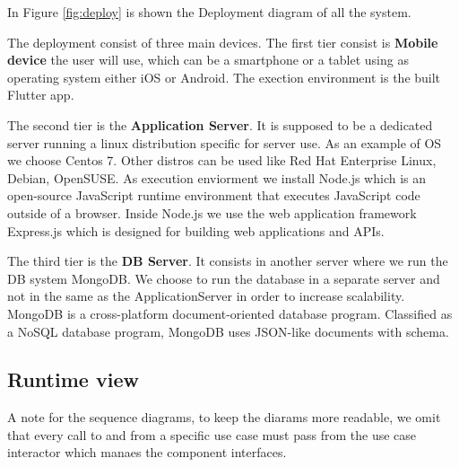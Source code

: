 In Figure \ref{fig:deploy} is shown the Deployment diagram of all the system.

The deployment consist of three main devices. The first tier consist is \textbf{Mobile device} the user will use, which can be a smartphone or a tablet using as operating system either iOS or Android.
The exection environment is the built Flutter app.


The second tier is the \textbf{Application Server}. It is supposed to be a dedicated server running a linux distribution specific for server use. As an example of OS we choose Centos 7. Other distros can be used like Red Hat Enterprise Linux, Debian, OpenSUSE.
As execution enviorment we install Node.js which is an open-source JavaScript runtime environment that executes JavaScript code outside of a browser. Inside Node.js we use the web application framework Express.js which is designed for building web applications and APIs.


The third tier is the \textbf{DB Server}. It consists in another server where we run the DB system MongoDB. We choose to run the database in a separate server and not in the same as the ApplicationServer in order to increase scalability. MongoDB is a cross-platform document-oriented database program. Classified as a NoSQL database program, MongoDB uses JSON-like documents with schema.






\subsection{Runtime view}
A note for the sequence diagrams, to keep the diarams more readable, we omit that every call to and from a specific use case must pass from the use case interactor which manaes the component interfaces.


